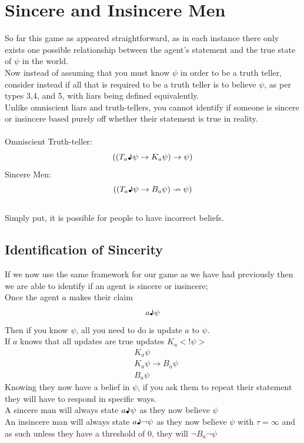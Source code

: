 \documentclass[12pt, titlepage, twoside, a4paper]{report}
\begin{document}
{\section{Sincere and Insincere Men}
So far this game as appeared straightforward, as in each instance there only exists one possible relationship between the agent's statement and the true state of $\psi$ in the world.\\
Now instead of assuming that you must know $\psi$ in order to be a truth teller, consider instead if all that is required to be a truth teller is to believe $\psi$, as per types 3,4, and 5, with liars being defined equivalently.\\
Unlike omniscient liars and truth-tellers, you cannot identify if someone is sincere or insincere based purely off whether their statement is true in reality.\\
\\
Omniscient Truth-teller:
$$((T_a \text{\textmusicalnote} \psi \to K_a \psi)\to \psi)$$
Sincere Men:
$$((T_a \text{\textmusicalnote} \psi \to B_a \psi)\nrightarrow \psi)$$ \\
Simply put, it is possible for people to have incorrect beliefs.

\subsection{Identification of Sincerity}
If we now use the same framework for our game as we have had previously then we are able to identify if an agent is sincere or insincere;\\
Once the agent $a$ makes their claim 
$$a\text{\textmusicalnote} \psi$$
Then if you know $\psi$, all you need to do is update $a$ to $\psi$.\\
If $a$ knows that all updates are true updates $K_a<!\psi >$
\begin{align*}
&K_a \psi\\
&K_a \psi \to B_a \psi\\
&B_a \psi
\end{align*}
Knowing they now have a belief in $\psi$, if you ask them to repeat their statement they will have to respond in specific ways.\\
A sincere man will always state $a \text{\textmusicalnote} \psi$ as they now believe $\psi$\\
An insincere man will always state $a \text{\textmusicalnote} \neg \psi$ as they now believe $\psi$ with $\tau = \infty$ and as such unless they have a threshold of $0$, they will $\neg B_a \neg \psi$

}
\end{document}
